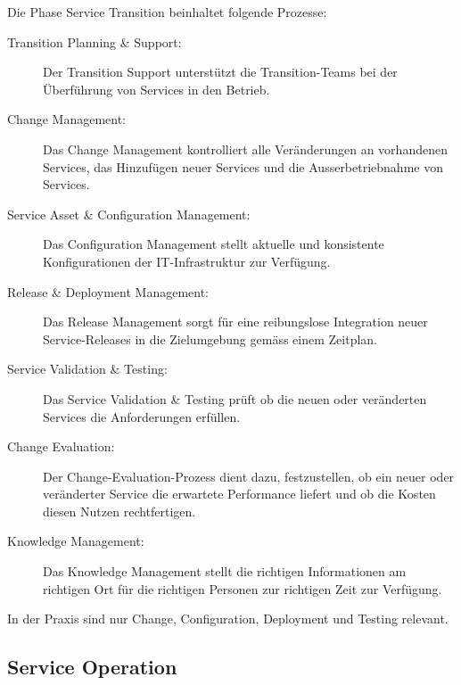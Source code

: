 Die Phase Service Transition beinhaltet folgende Prozesse:
\begin{description}
	\item[Transition Planning \& Support:] Der Transition Support unterstützt die Transition-Teams bei der Überführung von Services in den Betrieb.
	\item[Change Management:] Das Change Management kontrolliert alle Veränderungen an vorhandenen Services, das Hinzufügen
	neuer Services und die Ausserbetriebnahme von Services.
	\item[Service Asset \& Configuration Management:] Das Configuration Management stellt aktuelle und konsistente Konfigurationen der IT-Infrastruktur zur Verfügung.
	\item[Release \& Deployment Management:] Das Release Management sorgt für eine reibungslose Integration neuer Service-Releases in die Zielumgebung gemäss einem Zeitplan.
	\item[Service Validation \& Testing:] Das Service Validation \& Testing prüft ob die neuen oder veränderten Services die Anforderungen erfüllen.
	\item[Change Evaluation:] Der Change-Evaluation-Prozess dient dazu, festzustellen, ob ein neuer oder veränderter Service die erwartete Performance liefert und ob die Kosten diesen Nutzen rechtfertigen.
	\item[Knowledge Management:] Das Knowledge Management stellt die richtigen Informationen am richtigen
	Ort für die richtigen Personen zur richtigen Zeit zur Verfügung.
\end{description}
In der Praxis sind nur Change, Configuration, Deployment und Testing relevant.

\subsection{Service Operation}

